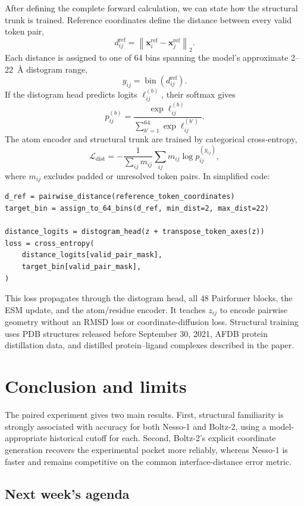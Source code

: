 \documentclass[11pt]{article}
\begin{document}
After defining the complete forward calculation, we can state how the
structural trunk is trained. Reference coordinates define the distance between
every valid token pair,
\[
  d_{ij}^{\mathrm{ref}}
  =\left\|\mathbf x_i^{\mathrm{ref}}-\mathbf x_j^{\mathrm{ref}}\right\|_2.
\]
Each distance is assigned to one of 64 bins spanning the model's approximate
2--22~\AA{} distogram range,
\[
  y_{ij}=\operatorname{bin}\!\left(d_{ij}^{\mathrm{ref}}\right).
\]
If the distogram head predicts logits $\ell_{ij}^{(b)}$, their softmax gives
\[
  p_{ij}^{(b)}
  =\frac{\exp\ell_{ij}^{(b)}}{\sum_{b'=1}^{64}\exp\ell_{ij}^{(b')}}.
\]
The atom encoder and structural trunk are trained by categorical
cross-entropy,
\[
  \mathcal L_{\mathrm{dist}}
  =-\frac{1}{\sum_{ij}m_{ij}}
  \sum_{ij}m_{ij}\log p_{ij}^{(y_{ij})},
\]
where $m_{ij}$ excludes padded or unresolved token pairs. In simplified code:
\begin{verbatim}
d_ref = pairwise_distance(reference_token_coordinates)
target_bin = assign_to_64_bins(d_ref, min_dist=2, max_dist=22)

distance_logits = distogram_head(z + transpose_token_axes(z))
loss = cross_entropy(
    distance_logits[valid_pair_mask],
    target_bin[valid_pair_mask],
)
\end{verbatim}
This loss propagates through the distogram head, all 48 Pairformer blocks, the
ESM update, and the atom/residue encoder. It teaches $z_{ij}$ to encode pairwise
geometry without an RMSD loss or coordinate-diffusion loss. Structural training
uses PDB structures released before September 30, 2021, AFDB protein
distillation data, and distilled protein--ligand complexes described in the
paper.


\section{Conclusion and limits}

The paired experiment gives two main results. First, structural familiarity is
strongly associated with accuracy for both Nesso-1 and Boltz-2, using a
model-appropriate historical cutoff for each. Second, Boltz-2's explicit
coordinate generation recovers the experimental pocket more reliably, whereas
Nesso-1 is faster and remains competitive on the common interface-distance
error metric.

\subsection*{Next week's agenda}
\end{document}
